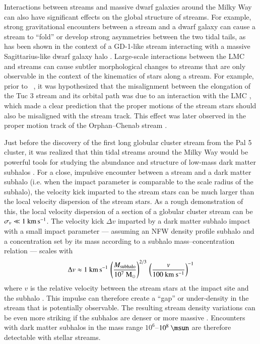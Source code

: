 \documentclass[final,5p,times,twocolumn,authoryear]{elsarticle}
\begin{document}
Interactions between streams and massive dwarf galaxies around the Milky Way can also
have significant effects on the global structure of streams.
For example, strong gravitational encounters between a stream and a dwarf galaxy can
cause a stream to ``fold'' or develop strong asymmetries between the two tidal tails, as
has been shown in the context of a GD-1-like stream interacting with a massive
Sagittarius-like dwarf galaxy halo \citep{dillamore:2022}.
Large-scale interactions between the LMC and streams can cause subtler morphological
changes to streams that are only observable in the context of the kinematics of stars
along a stream.
For example, prior to \gaia\ , it was hypothesized that the misalignment between
the elongation of the Tuc 3 stream and its orbital path was due to an interaction with
the LMC \citep{erkal:2018}, which made a clear prediction that the proper motions of the
stream stars should also be misaligned with the stream track.
This effect was later observed in the proper motion track of the Orphan--Chenab stream
\citep{koposov:2019, erkal:2019}.

Just before the discovery of the first long globular cluster stream from the Pal 5
cluster, it was realized that thin tidal streams around the Milky Way would be powerful
tools for studying the abundance and structure of low-mass dark matter subhalos
\citep{ibata:2002,johnston:2002}.
For a close, impulsive encounter between a stream and a dark matter subhalo (i.e. when
the impact parameter is comparable to the scale radius of the subhalo), the velocity
kick imparted to the stream stars can be much larger than the local velocity dispersion
of the stream stars.
As a rough demonstration of this, the local velocity dispersion of a section of a
globular cluster stream can be $\sigma_v \ll 1~\kms$.
The velocity kick $\Delta v$ imparted by a dark matter subhalo impact with a small
impact parameter --- assuming an NFW density profile subhalo and a concentration set by
its mass according to a subhalo mass--concentration relation \citep{moline:2017} ---
scales with
\begin{equation}
    \Delta v \approx 1~\kms \,
        \left(\frac{M_{\rm subhalo}}{10^7~{\rm M}_\odot}\right)^{2/3}\,
        \left(\frac{v}{100~{\rm km}~{\rm s}^{-1}}\right)^{-1}
\end{equation}
where $v$ is the relative velocity between the stream stars at the impact site and the
subhalo \citep[see also][]{erkal:2015a, sanders:2016}.
This impulse can therefore create a ``gap'' or under-density in the stream that is
potentially observable.
The resulting stream density variations can be even more striking if the subhalos are
denser or more massive \citep[see, e.g.,][]{yoon:2011, bonaca:2014}.
Encounters with dark matter subhalos in the mass range $10^6$--$10^8~\unit{\msun}$ are
therefore detectable with stellar streams.
\end{document}

